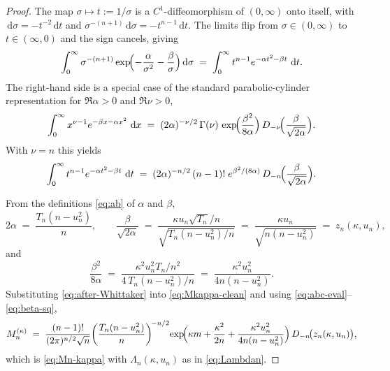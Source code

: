 \documentclass[numsec,webpdf,modern,medium,namedate]{oup-authoring-template}
\theoremstyle{thmstyleone}%
\theoremstyle{thmstyletwo}%
\theoremstyle{thmstylethree}%
\newcommand{\dd}{\,\mathrm{d}}
\newcommand{\1}{\mathbf{1}}
\begin{document}
\begin{proof}
The map $\sigma\mapsto t:=1/\sigma$ is a $C^1$-diffeomorphism of
$(0,\infty)$ onto itself, with $\dd\sigma=-t^{-2}\dd t$ and
$\sigma^{-(n+1)}\dd\sigma=-t^{n-1}\dd t$. The limits flip from
$\sigma\in(0,\infty)$ to $t\in(\infty,0)$ and the sign cancels, giving
\begin{equation}\label{eq:Whittaker-input}
  \int_0^\infty\sigma^{-(n+1)}
  \exp\!\Bigl(-\frac{\alpha}{\sigma^2}-\frac{\beta}{\sigma}\Bigr)\dd\sigma
  \;=\;\int_0^\infty t^{n-1}e^{-\alpha t^2-\beta t}\,\dd t.
\end{equation}
The right-hand side is a special case of the standard
parabolic-cylinder representation for $\Re\alpha>0$ and $\Re\nu>0$,
\begin{equation}\label{eq:pcyl-int}
  \int_0^\infty x^{\nu-1}e^{-\beta x-\alpha x^2}\,\dd x
  \;=\;(2\alpha)^{-\nu/2}\,\Gamma(\nu)\,
  \exp\!\Bigl(\frac{\beta^2}{8\alpha}\Bigr)\,
  D_{-\nu}\!\Bigl(\frac{\beta}{\sqrt{2\alpha}}\Bigr).
\end{equation}
With $\nu=n$ this yields
\begin{equation}\label{eq:after-Whittaker}
  \int_0^\infty t^{n-1}e^{-\alpha t^2-\beta t}\,\dd t
  \;=\;(2\alpha)^{-n/2}\,(n-1)!\;
  e^{\beta^2/(8\alpha)}\,
  D_{-n}\!\Bigl(\frac{\beta}{\sqrt{2\alpha}}\Bigr).
\end{equation}

From the definitions \eqref{eq:ab} of $\alpha$ and $\beta$,
\begin{equation}\label{eq:abc-eval}
  2\alpha\;=\;\frac{T_n(n-u_n^2)}{n},\qquad
  \frac{\beta}{\sqrt{2\alpha}}
  \;=\;\frac{\kappa u_n\sqrt{T_n}/n}{\sqrt{T_n(n-u_n^2)/n}}
  \;=\;\frac{\kappa u_n}{\sqrt{n(n-u_n^2)}}
  \;=\;z_n(\kappa,u_n),
\end{equation}
and
\begin{equation}\label{eq:beta-sq}
  \frac{\beta^2}{8\alpha}
  \;=\;\frac{\kappa^2 u_n^2 T_n/n^2}{4\,T_n(n-u_n^2)/n}
  \;=\;\frac{\kappa^2 u_n^2}{4n(n-u_n^2)}.
\end{equation}
Substituting \eqref{eq:after-Whittaker} into \eqref{eq:Mkappa-clean}
and using \eqref{eq:abc-eval}--\eqref{eq:beta-sq},
\[
  M_n^{(\kappa)}
  \;=\;\frac{(n-1)!}{(2\pi)^{n/2}\sqrt n}
  \!\left(\frac{T_n(n-u_n^2)}{n}\right)^{\!-n/2}\!
  \exp\!\Bigl(\kappa m+\frac{\kappa^2}{2n}
  +\frac{\kappa^2 u_n^2}{4n(n-u_n^2)}\Bigr)\,
  D_{-n}\!\bigl(z_n(\kappa,u_n)\bigr),
\]
which is \eqref{eq:Mn-kappa} with $\Lambda_n(\kappa,u_n)$ as in
\eqref{eq:Lambdan}.


\end{proof}
\end{document}
